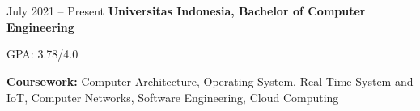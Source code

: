 \documentclass[../main.tex]{subfiles}
\begin{document}
\section{}

\begin{twocolentry}{
    July 2021 – Present
}
    \textbf{Universitas Indonesia, Bachelor of Computer Engineering}
\end{twocolentry}

\vspace{0.10 cm}
\begin{onecolentry}
\begin{highlights}
    \item GPA: 3.78/4.0
    \item \textbf{Coursework:} Computer Architecture, Operating System, Real Time System and IoT, Computer Networks, Software Engineering, Cloud Computing
\end{highlights}
\end{onecolentry}
\end{document}
